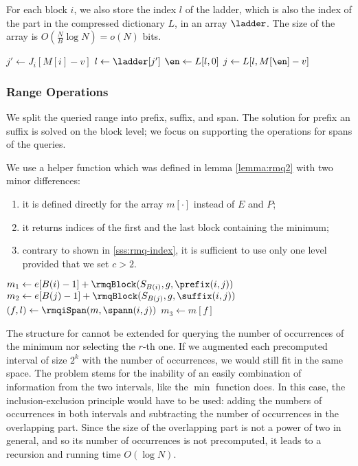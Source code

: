 For each block $i$, we also store the index $l$ of the ladder, which is also the index of the part in the compressed dictionary $L$, in an array $\ladder$.
The size of the array is $O(\frac{N}{B} \log N) = o(N)$ bits.

\begin{algorithm}
\begin{algorithmic}
	\State $j' \gets J_i[M[i] - v]$ 
	\State $l \gets \ladder[j']$ 
	\State $\en \gets L[l, 0]$
	\State $j \gets L[l, M[\en] - v]$ 
	\State {}
\EndFunction
\end{algorithmic}
\end{algorithm}

\subsubsection{Range Operations}

We split the queried range into prefix, suffix, and span.
The solution for prefix an suffix is solved on the block level; we focus on supporting the operations for spans of the queries.

We use a helper function \rmqiSpan{} which was defined in lemma \ref{lemma:rmq2} with two minor differences:
\begin{enumerate}
	\item it is defined directly for the array $m[\cdot]$ instead of $E$ and $P$;
	\item it returns indices of the first and the last block containing the minimum;
	\item contrary to \rmqi{} shown in \ref{sss:rmq-index}, it is sufficient to use only one level provided that we set $c > 2$.
\end{enumerate}

\begin{algorithm}
\begin{algorithmic}
	\State $m_1 \gets e[B(i) - 1] + \rmqBlock(S_{B(i)}, g, \prefix(i, j))$
	\State $m_2 \gets e[B(j) - 1] + \rmqBlock(S_{B(j)}, g, \suffix(i, j))$
	\State $(f, l) \gets \rmqiSpan(m, \spann(i, j))$
	\State $m_3 \gets m[f]$
	\State {}
\EndFunction
\end{algorithmic}
\end{algorithm}

The structure for \rmqiSpan{} cannot be extended for querying the number of occurrences of the minimum nor selecting the $r$-th one.
If we augmented each precomputed interval of size $2^k$ with the number of occurrences, we would still fit in the same space.
The problem stems for the inability of an easily combination of information from the two intervals, like the $\min$ function does.
In this case, the inclusion-exclusion principle would have to be used: adding the numbers of occurrences in both intervals and subtracting the number of occurrences in the overlapping part.
Since the size of the overlapping part is not a power of two in general, and so its number of occurrences is not precomputed, it leads to a recursion and running time $O(\log N)$.

